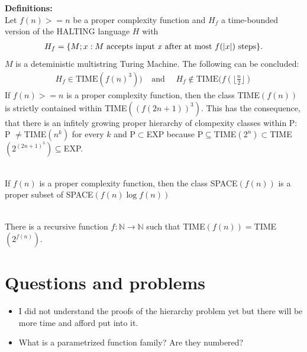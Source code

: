 \documentclass[a4]{scrartcl}
\begin{document}
\textbf{Definitions:} \cite{book, CC} \\
Let $f(n) >= n$ be a proper complexity function and $H_f$ a time-bounded version of the HALTING language $H$ with
\begin{align*}
H_f = \{ M; x:M \text{ accepts input \textit{x} after at most } f(|x|) \text{ steps} \}.
\end{align*}
$M$ is a deteministic multistring Turing Machine. The following can be concluded:
\begin{align*}
H_f \in \text{TIME}(f(n)^3))  \  \ \ \ \ \text{and} \ \ \ \ \ \ H_f \notin \text{TIME}(f(\lfloor \frac{n}{2} \rfloor )
\end{align*}
If $f(n) >= n$ is a proper complexity function, then the class TIME$(f(n))$ is strictly contained within TIME$((f(2n+1))^3)$.
This has the consequence, that there is an infitely growing proper hierarchy of clompexity classes within P: P $\neq$TIME$(n^k)$ for every $k$ and P$\subset$EXP because P$\subseteq$TIME$(2^n) \subset$TIME$(2^{(2n+1)^3}) \subseteq$EXP.

\ \\
If $f(n)$ is a proper complexity function, then the class SPACE$(f(n))$ is a proper subset of SPACE$(f(n) \log f(n))$ 

\
\\
There is a recursive function $f: \mathbb{N} \rightarrow \mathbb{N}$ such that TIME$(f(n))=$TIME$(2^{f(n)})$.







\section*{Questions and problems}
\begin{itemize}
\item I did not understand the proofs of the hierarchy problem yet but there will be more time and afford put into it.
\item What is a parametrized function family? Are they numbered?
\end{itemize}

\newpage

\printbibliography
\end{document}
